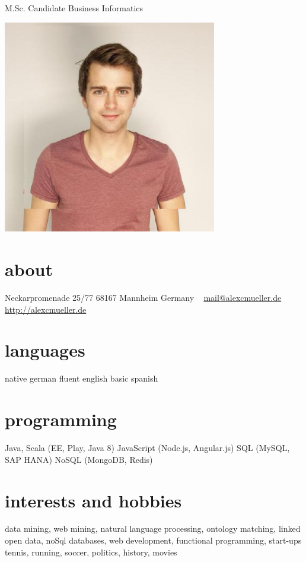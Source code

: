 \documentclass[a4paper]{friggeri-cv}
\begin{document}
       {M.Sc. Candidate Business Informatics}


\begin{aside}
 \includegraphics[width=0.7\textwidth]{bild.jpg}
  \section{about}
   	Neckarpromenade 25/77
    68167 Mannheim
    Germany
    ~
    \href{mailto:alexan.chr.mueller@gmail.com}{mail@alexcmueller.de}
    \href{http://alexcmueller.de}{http://alexcmueller.de}
  \section{languages}
    native german
    fluent english
    basic spanish
  \section{programming}
    Java, Scala
    (EE, Play, Java 8)
    JavaScript
    (Node.js, Angular.js)
    SQL
    (MySQL, SAP HANA)
    NoSQL
    (MongoDB, Redis)
\end{aside}

\section{interests and hobbies}

data mining, web mining, natural language processing, ontology matching, linked open data, noSql databases, web development, functional programming, start-ups \\
tennis, running, soccer, politics, history, movies
\end{document}
